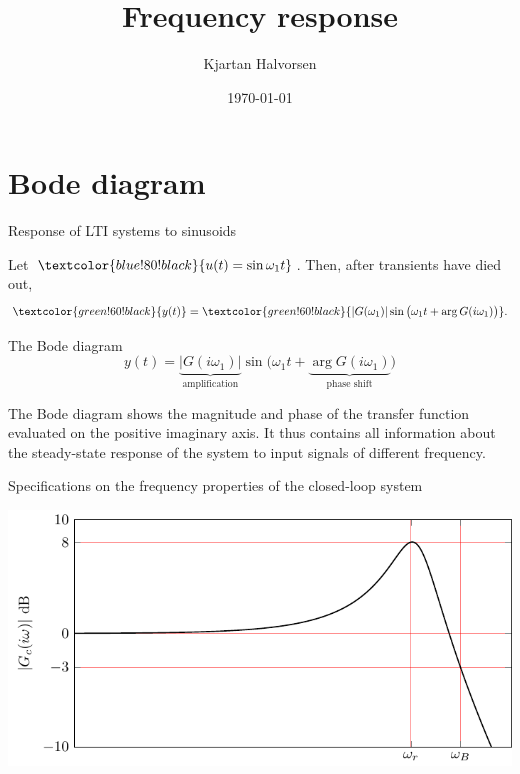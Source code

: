 \documentclass[presentation,aspectratio=169]{beamer}
\author{Kjartan Halvorsen}
\date{\today}
\title{Frequency response}
\def\ucolor{blue!80!black}
\def\ycolor{green!60!black}
\newcommand*{\incolor}[1]{\textcolor{\ucolor}{#1}}
\newcommand*{\outcolor}[1]{\textcolor{\ycolor}{#1}}
\begin{document}
\maketitle

\section{Bode diagram}
\label{sec:org5cef5fe}

\begin{frame}[label={sec:org4743eeb}]{Response of LTI systems to sinusoids}
\begin{center}
\end{center}

Let \(\incolor{u(t) = \sin\omega_1 t}\). Then, after transients have died out,
\[ \outcolor{y(t)}= \outcolor{|G(\omega_1)| \sin \big( \omega_1 t + \arg G(i\omega_1)\big)}. \]
\end{frame}


\begin{frame}[label={sec:org1f6e92c}]{The Bode diagram}
\[ y(t) = \underbrace{|G(i\omega_1)|}_{\text{amplification}} \sin \big( \omega_1 t + \underbrace{\arg G(i\omega_1)}_{\text{phase shift}} \big) \]

The Bode diagram shows the \alert{magnitude} and \alert{phase} of the transfer function evaluated on the positive imaginary axis. It thus contains all information about the steady-state response of the system to input signals of different frequency.
\end{frame}


\begin{frame}[label={sec:orgc0966ac}]{Specifications on the frequency properties of the closed-loop system}
\begin{center}
\includegraphics[width=0.899\linewidth]{../../figures/spec-bode-closed-loop-new}
\end{center}
\end{frame}
\end{document}
